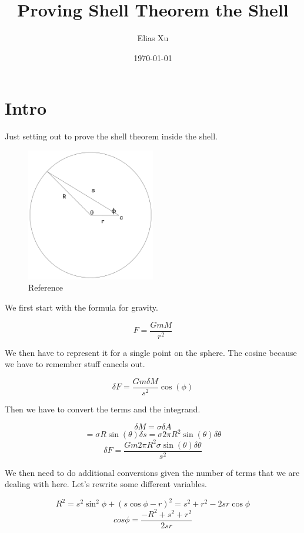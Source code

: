 \documentclass{article}
\begin{document}
\title{Proving Shell Theorem the Shell}
\author{Elias Xu}
\date{\today}
\maketitle

\setlength{\parindent}{0pt}


\section{Intro}

Just setting out to prove the shell theorem inside the shell.

\begin{figure}[H]
    \centering
    \includegraphics[width=0.5\textwidth]{figures/init_shape.png}
    \caption{Reference}
\end{figure}

We first start with the formula for gravity.

$$F = \frac{G m M }{r^2}$$

We then have to represent it for a single point on the sphere. The cosine because we have to remember stuff cancels out.

$$\delta F = \frac{G m \delta M}{s^2} \cos(\phi)$$

Then we have to convert the terms and the integrand. 

$$\delta M = \sigma \delta A$$
$$ = \sigma R \sin(\theta) \delta s = \sigma 2 \pi R^2 \sin(\theta ) \delta \theta$$
$$\delta F = \frac{G m 2 \pi R^2 \sigma  \sin(\theta) \delta \theta}{s^2}$$

We then need to do additional conversions given the number of terms that we are dealing with here. Let's rewrite some different variables. 

$$R^2 = s^2 \sin^2 \phi + (s\cos\phi - r)^2 = s^2 + r^2 - 2sr\cos\phi$$
$$cos \phi = \frac{- R^2 + s^2 + r^2}{2sr}$$
\end{document}
